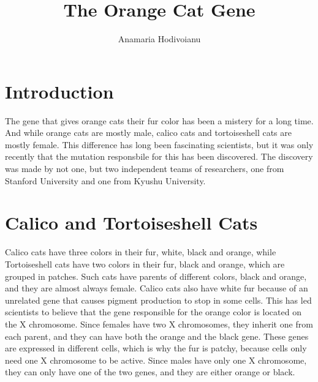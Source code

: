 \documentclass{article}
\title{The Orange Cat Gene}
\author{Anamaria Hodivoianu}
\begin{document}
\maketitle

\section{Introduction}
The gene that gives orange cats their fur color has been a mistery for a long time. And while orange cats are mostly male, calico cats and tortoiseshell cats are mostly female. This difference has long been fascinating scientists, but it was only recently that the mutation responsbile for this has been discovered. The discovery was made by not one, but two independent teams of researchers, one from Stanford University and one from Kyushu University.

\section{Calico and Tortoiseshell Cats}
Calico cats have three colors in their fur, white, black and orange, while Tortoiseshell cats have two colors in their fur, black and orange, which are grouped in patches. Such cats have parents of different colors, black and orange, and they are almost always female. Calico cats also have white fur because of an unrelated gene that causes pigment production to stop in some cells. This has led scientists to believe that the gene responsible for the orange color is located on the X chromosome. Since females have two X chromosomes, they inherit one from each parent, and they can have both the orange and the black gene. These genes are expressed in different cells, which is why the fur is patchy, because cells only need one X chromosome to be active. Since males have only one X chromosome, they can only have one of the two genes, and they are either orange or black.
\end{document}
